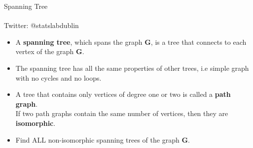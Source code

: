\documentclass{beamer}
\begin{document}
\begin{frame}



\begin{center}
{\Huge Spanning Tree  } \\

\\ \vspace{0.4cm}
{\Large Twitter: @statslabdublin}
\end{center}
\end{frame}

\begin{frame}
\Large
\begin{itemize}
\item A \textbf{spanning tree}, which spans the graph \textbf{G}, is a tree that connects to each vertex of the graph \textbf{G}.

\item The spanning tree has all the same properties of other trees, i.e simple graph with no cycles and no loops.

\item A tree that contains only vertices of degree one or two is called a \textbf{path graph}. \\If two path graphs contain the same number of vertices, then they are \textbf{isomorphic}. 
\end{itemize}
\end{frame}

\begin{frame}
\Large
\begin{itemize}
\item Find ALL non-isomorphic spanning trees of the graph \textbf{G}.
\end{itemize}
\end{frame}
\end{document}
